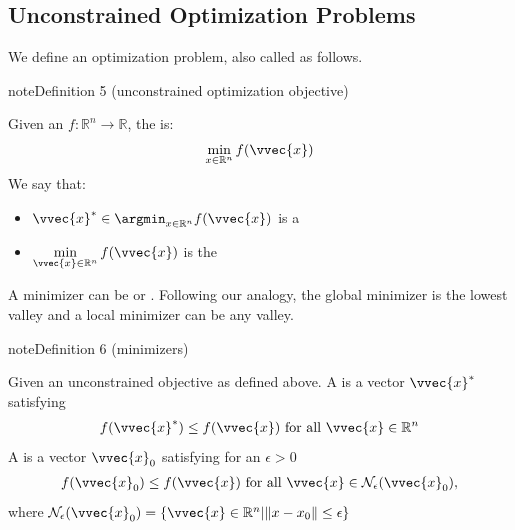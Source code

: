 \documentclass[letterpaper,10pt,english]{jupyterBook}
\begin{document}
\subsection{Unconstrained Optimization Problems}
\label{\detokenize{optimization_problems:unconstrained-optimization-problems}}
\sphinxAtStartPar
We define an optimization problem, also called  as follows.
\label{optimization_problems:objective}
\begin{sphinxadmonition}{note}{Definition 5 (unconstrained optimization objective)}



\sphinxAtStartPar
Given an  \(f:\mathbb{R}^n\rightarrow \mathbb{R}\), the  is:
\begin{equation*}
\begin{split}\begin{align*}
        \min_{x\in\mathbb{R}^n} f(\vvec{x})
    \end{align*}\end{split}
\end{equation*}
We say that:
\begin{itemize}
\item {} 
\sphinxAtStartPar
\(\displaystyle \vvec{x}^*\in\argmin_{x\in\mathbb{R}^n}f(\vvec{x})\) is a 

\item {} 
\sphinxAtStartPar
\(\displaystyle \min_{\vvec{x}\in\mathbb{R}^n}f(\vvec{x})\) is the 

\end{itemize}
\end{sphinxadmonition}

\sphinxAtStartPar
A minimizer can be  or . Following our analogy, the global minimizer is the lowest valley and a local minimizer can be any valley.
\label{optimization_problems:minimizers}
\begin{sphinxadmonition}{note}{Definition 6 (minimizers)}



\sphinxAtStartPar
Given an unconstrained objective as defined above. A  is a vector \(\vvec{x}^*\) satisfying
\begin{equation*}
\begin{split}
  f(\vvec{x}^*)\leq f(\vvec{x}) \text{ for all } \vvec{x}\in\mathbb{R}^n
\end{split}
\end{equation*}
A  is a vector \(\vvec{x}_0\) satisfying for an \(\epsilon>0\)
\begin{equation*}
\begin{split}f(\vvec{x}_0)\leq f(\vvec{x}) \text{ for all } \vvec{x}\in\mathcal{N}_\epsilon(\vvec{x}_0),\end{split}
\end{equation*}
where \(\mathcal{N}_\epsilon(\vvec{x}_0) = \{\vvec{x}\in\mathbb{R}^n\vert \lVert x-x_0\rVert\leq \epsilon\}\)
\end{sphinxadmonition}
\end{document}
